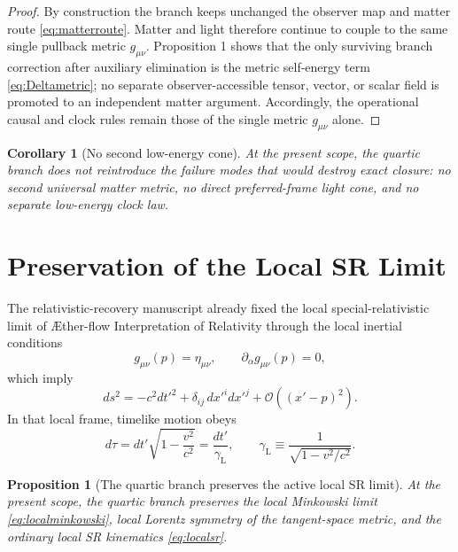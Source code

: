 \documentclass[11pt]{article}
\newcommand{\Aflow}{\AE{}ther-flow}
\newcommand{\TheoryName}{\Aflow{} Interpretation of Relativity}
\newcommand{\Lor}{\gamma_{\mathrm{L}}}
\newtheorem{proposition}{Proposition}
\newtheorem{corollary}{Corollary}
\begin{document}
\begin{proof}
By construction the branch keeps unchanged the observer map and matter route \eqref{eq:matterroute}. Matter and light therefore continue to couple to the same single pullback metric \(g_{\mu\nu}\). Proposition 1 shows that the only surviving branch correction after auxiliary elimination is the metric self-energy term \eqref{eq:Deltametric}; no separate observer-accessible tensor, vector, or scalar field is promoted to an independent matter argument. Accordingly, the operational causal and clock rules remain those of the single metric \(g_{\mu\nu}\) alone.
\end{proof}

\begin{corollary}[No second low-energy cone]
At the present scope, the quartic branch does not reintroduce the failure modes that would destroy exact closure: no second universal matter metric, no direct preferred-frame light cone, and no separate low-energy clock law.
\end{corollary}

\section{Preservation of the Local SR Limit}

The relativistic-recovery manuscript already fixed the local special-relativistic limit of \TheoryName{} through the local inertial conditions
\begin{equation}
g_{\mu\nu}(p)=\eta_{\mu\nu},
\qquad
\partial_\alpha g_{\mu\nu}(p)=0,
\label{eq:localinertial}
\end{equation}
which imply
\begin{equation}
ds^2
=
-c^2dt'^2+\delta_{ij}\,dx'^i dx'^j
+ \mathcal O((x'-p)^2).
\label{eq:localminkowski}
\end{equation}
In that local frame, timelike motion obeys
\begin{equation}
d\tau
=
dt'\sqrt{1-\frac{v^2}{c^2}}
=
\frac{dt'}{\Lor},
\qquad
\Lor\equiv \frac{1}{\sqrt{1-v^2/c^2}}.
\label{eq:localsr}
\end{equation}

\begin{proposition}[The quartic branch preserves the active local SR limit]
At the present scope, the quartic branch preserves the local Minkowski limit \eqref{eq:localminkowski}, local Lorentz symmetry of the tangent-space metric, and the ordinary local SR kinematics \eqref{eq:localsr}.
\end{proposition}
\end{document}
